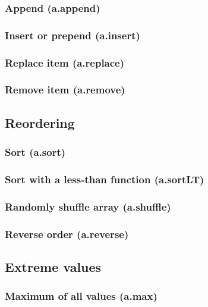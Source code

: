 \documentclass{article}
\theoremstyle{definition}
\begin{document}
\subsubsection{Append (a.append)}

\subsubsection{Insert or prepend (a.insert)}

\subsubsection{Replace item (a.replace)}

\subsubsection{Remove item (a.remove)}

\subsection{Reordering}

\subsubsection{Sort (a.sort)}

\subsubsection{Sort with a less-than function (a.sortLT)}

\subsubsection{Randomly shuffle array (a.shuffle)}

\subsubsection{Reverse order (a.reverse)}

\subsection{Extreme values}

\subsubsection{Maximum of all values (a.max)}
\end{document}
